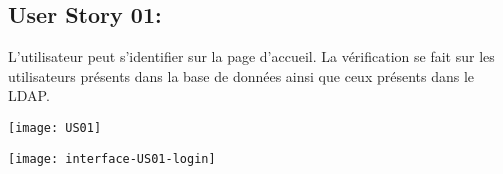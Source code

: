 \newpage{}
\subsection{User Story 01:}
L'utilisateur peut s'identifier sur la page d'accueil. La vérification se fait sur les utilisateurs présents dans la base de données
ainsi que ceux présents dans le LDAP.


\begin{center}
      \texttt{[image: US01]}
\end{center}



\begin{center}
      \texttt{[image: interface-US01-login]}
\end{center}

